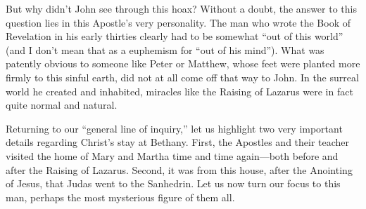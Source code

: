 But why didn't John see through this hoax? Without a doubt, the answer to this question lies in this Apostle's very personality. The man who wrote the Book of Revelation in his early thirties clearly had to be somewhat ``out of this world'' (and I don't mean that as a euphemism for ``out of his mind''). What was patently obvious to someone like Peter or Matthew, whose feet were planted more firmly to this sinful earth, did not at all come off that way to John. In the surreal world he created and inhabited, miracles like the Raising of Lazarus were in fact quite normal and natural.

Returning to our ``general line of inquiry,'' let us highlight two very important details regarding Christ's stay at Bethany. First, the Apostles and their teacher visited the home of Mary and Martha time and time again---both before and after the Raising of Lazarus. Second, it was from this house, after the Anointing of Jesus, that Judas went to the Sanhedrin. Let us now turn our focus to this man, perhaps the most mysterious figure of them all.